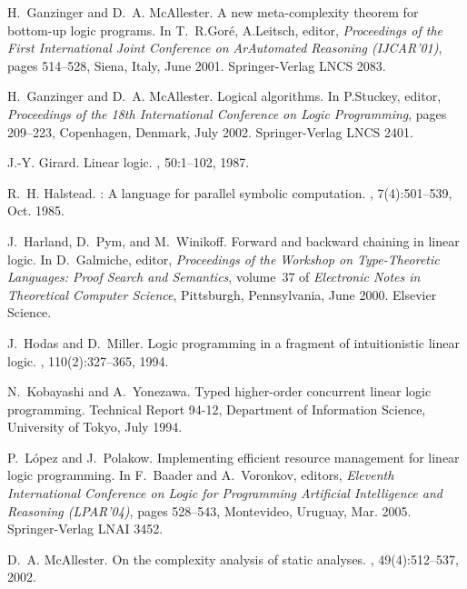 \documentclass{sig-alt}
\begin{document}
\begin{thebibliography}{50}
H.~Ganzinger and D.~A. McAllester.
\newblock A new meta-complexity theorem for bottom-up logic programs.
\newblock In T.~R.Gor{\'e}, A.Leitsch, editor, {\em Proceedings of the First
  International Joint Conference on ArAutomated Reasoning (IJCAR'01)}, pages
  514--528, Siena, Italy, June 2001. Springer-Verlag LNCS 2083.

H.~Ganzinger and D.~A. McAllester.
\newblock Logical algorithms.
\newblock In P.Stuckey, editor, {\em Proceedings of the 18th International
  Conference on Logic Programming}, pages 209--223, Copenhagen, Denmark, July
  2002. Springer-Verlag LNCS 2401.

J.-Y. Girard.
\newblock Linear logic.
, 50:1--102, 1987.

R.~H. Halstead.
: A language for parallel symbolic computation.
,
  7(4):501--539, Oct. 1985.

J.~Harland, D.~Pym, and M.~Winikoff.
\newblock Forward and backward chaining in linear logic.
\newblock In D.~Galmiche, editor, {\em Proceedings of the Workshop on
  Type-Theoretic Languages: Proof Search and Semantics}, volume~37 of {\em
  Electronic Notes in Theoretical Computer Science}, Pittsburgh, Pennsylvania,
  June 2000. Elsevier Science.

J.~Hodas and D.~Miller.
\newblock Logic programming in a fragment of intuitionistic linear logic.
, 110(2):327--365, 1994.

N.~Kobayashi and A.~Yonezawa.
\newblock Typed higher-order concurrent linear logic programming.
\newblock Technical Report 94-12, Department of Information Science, University
  of Tokyo, July 1994.

P.~L\'{o}pez and J.~Polakow.
\newblock Implementing efficient resource management for linear logic
  programming.
\newblock In F.~Baader and A.~Voronkov, editors, {\em Eleventh International
  Conference on Logic for Programming Artificial Intelligence and Reasoning
  (LPAR'04)}, pages 528--543, Montevideo, Uruguay, Mar. 2005. Springer-Verlag
  LNAI 3452.

D.~A. McAllester.
\newblock On the complexity analysis of static analyses.
, 49(4):512--537, 2002.


\end{thebibliography}
\end{document}
